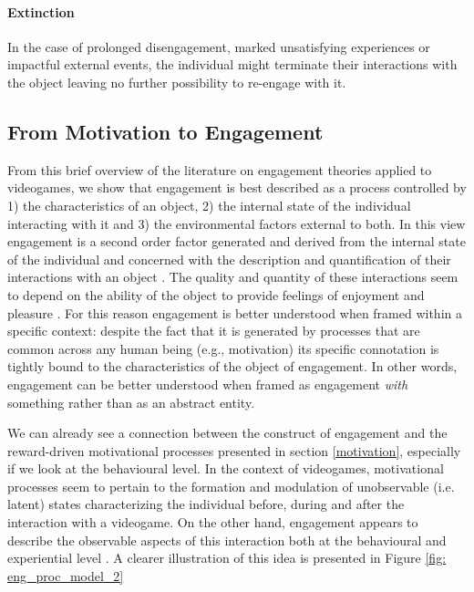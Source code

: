 \paragraph*{Extinction} In the case of prolonged disengagement, marked unsatisfying experiences or impactful external events, the individual might terminate their interactions with the object leaving no further possibility to re-engage with it.

\subsection{From Motivation to Engagement}
\label{eng_reward_motivation}
From this brief overview of the literature on engagement theories applied to videogames, we show that engagement is best described as a process controlled by 1) the characteristics of an object, 2) the internal state of the individual interacting with it and 3) the environmental factors external to both. In this view engagement is a second order factor generated and derived from the internal state of the individual and concerned with the description and quantification of their interactions with an object  \cite{lucas2004sex,o2008user,jennett2008measuring,boyle2012engagement,connolly2012systematic,csikszentmihalyi2014toward}. The quality and quantity of these interactions seem to depend on the ability of the object to provide feelings of enjoyment and pleasure \cite{lucas2004sex,o2008user,jennett2008measuring,boyle2012engagement,connolly2012systematic,csikszentmihalyi2014toward}. For this reason engagement is better understood when framed within a specific context: despite the fact that it is generated by processes that are common across any human being (e.g., motivation) its specific connotation is tightly bound to the characteristics of the object of engagement. In other words, engagement can be better understood when framed as engagement \textit{ with }something rather than as an abstract entity. 

We can already see a connection between the construct of engagement and the reward-driven motivational processes presented in section \ref{motivation}, especially if we look at the behavioural level. In the context of videogames, motivational processes seem to pertain to the formation and modulation of unobservable (i.e. latent) states characterizing the individual before, during and after the interaction with a videogame. On the other hand, engagement appears to describe the observable aspects of this interaction both at the behavioural and experiential level \cite{lucas2004sex,o2008user,jennett2008measuring,boyle2012engagement,connolly2012systematic,csikszentmihalyi2014toward}. A clearer illustration of this idea is presented in Figure \ref{fig: eng_proc_model_2} 

